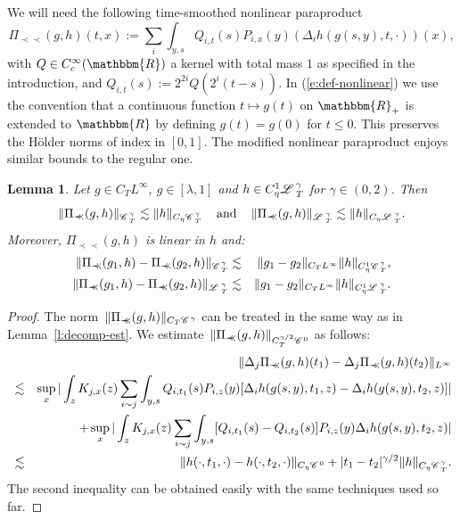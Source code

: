 \documentclass{amsart}
\newcommand{\assign}{:=}
\newcommand{\cdummy}{\cdot}
\newcommand{\precprec}{\prec\!\!\!\prec}
\newcommand{\tmop}[1]{\ensuremath{\operatorname{#1}}}
\newtheorem{lemma}[theorem]{Lemma}
\theoremstyle{remark}
\theoremstyle{definition}
\newcommand{\CC}{\mathscr{C} \hspace{.1em}}
\newcommand{\LL}{\mathscr{L} \hspace{.2em}}
\begin{document}
We will need the following time-smoothed nonlinear paraproduct
\begin{equation}
  \Pi_{\precprec} (g, h) (t, x) \assign \sum_i \int_{y, s} Q_{i, t} (s) P_{i,
  x} (y) (\Delta_i h (g (s, y), t, \cdot)) (x), \label{e:def-nonlinear}
\end{equation}
with $Q \in C^{\infty}_c (\mathbbm{R})$ a kernel with total mass $1$ as
specified in the introduction, and $Q_{i, t} (s) \assign 2^{2 i} Q (2^i (t -
s))$. In (\ref{e:def-nonlinear}) we use the convention that a continuous
function $t \mapsto g (t)$ on $\mathbbm{R}_+$ is extended to $\mathbbm{R}$ by
defining $g (t) = g (0)$ for $t \leqslant 0$. This preserves the H{\"o}lder
norms of index in $[0, 1]$. The modified nonlinear paraproduct enjoys similar
bounds to the regular one.

\begin{lemma}
  \label{l:nonlinear-est}Let $g \in C_T L^{\infty}$, $g \in [\lambda, 1]$ and
  $h \in C^1_{\eta} \LL_T^{\gamma}$ for $\gamma \in (0, 2)$. Then
  \[ \| \Pi_{\precprec} (g, h) \|_{\CC^{\gamma}_T} \lesssim \| h \|_{C_{\eta}
     \CC_T^{\gamma}} \quad \tmop{and} \quad \| \Pi_{\precprec} (g, h)
     \|_{\LL^{\gamma}_T} \lesssim \| h \|_{C_{\eta} \LL_T^{\gamma}} . \]
  Moreover, $\Pi_{\precprec} (g, h)$ is linear in $h$ and:
  \begin{eqnarray*}
    \| \Pi_{\precprec} (g_1, h) - \Pi_{\precprec} (g_2, h) \|_{\CC_T^{\gamma}}
    & \lesssim & \| g_1 - g_2 \|_{C_T L^{\infty}} \| h \|_{C^1_{\eta}
    \CC_T^{\gamma}},\\
    \| \Pi_{\precprec} (g_1, h) - \Pi_{\precprec} (g_2, h) \|_{\LL_T^{\gamma}}
    & \lesssim & \| g_1 - g_2 \|_{C_T L^{\infty}} \| h \|_{C^1_{\eta}
    \LL_T^{\gamma}} .
  \end{eqnarray*}
\end{lemma}

\begin{proof}
  The norm~$\| \Pi_{\precprec} (g, h) \|_{C_T \CC^{\gamma}}$ can be treated in
  the same way as in Lemma~\ref{l:decomp-est}. We estimate~$\| \Pi_{\precprec}
  (g, h) \|_{C_T^{\gamma / 2} \CC^0}$ as follows:
  \begin{eqnarray*}
    &  & \| \Delta_j \Pi_{\precprec} (g, h) (t_1) - \Delta_j \Pi_{\precprec}
    (g, h) (t_2) \|_{L^{\infty}}\\
    & \lesssim & \sup_x | \int_z K_{j, x} (z) \sum_{i \sim j} \int_{y, s}
    Q_{i, t_1} (s) P_{i, z} (y) [\Delta_i h (g (s, y), t_1, z) - \Delta_i h (g
    (s, y), t_2, z)] |\\
    &  & + \sup_x | \int_z K_{j, x} (z) \sum_{i \sim j} \int_{y, s} [Q_{i,
    t_1} (s) - Q_{i, t_2} (s)] P_{i, z} (y) \Delta_i h (g (s, y), t_2, z) |\\
    & \lesssim & \| h (\cdummy, t_1, \cdummy) - h (\cdummy, t_2, \cdummy)
    \|_{C_{\eta} \CC^0} + | t_1 - t_2 |^{\gamma / 2} \| h \|_{C_{\eta}
    \CC_T^{\gamma}} .
  \end{eqnarray*}
  The second inequality can be obtained easily with the same techniques used
  so far.
\end{proof}
\end{document}
